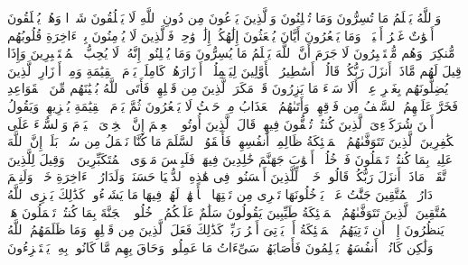 \startbuffer[\q:16:19]
وَٱللَّهُ یَعۡلَمُ مَا تُسِرُّونَ وَمَا تُعۡلِنُونَ%
\stopbuffer%
\startbuffer[\q:16:20]
وَٱلَّذِینَ یَدۡعُونَ مِن دُونِ ٱللَّهِ لَا یَخۡلُقُونَ شَیۡءࣰا وَهُمۡ یُخۡلَقُونَ%
\stopbuffer%
\startbuffer[\q:16:21]
أَمۡوَٰتٌ غَیۡرُ أَحۡیَاۤءࣲۖ وَمَا یَشۡعُرُونَ أَیَّانَ یُبۡعَثُونَ%
\stopbuffer%
\startbuffer[\q:16:22]
إِلَٰهُكُمۡ إِلَٰهࣱ وَٰحِدࣱۚ فَٱلَّذِینَ لَا یُؤۡمِنُونَ بِٱلۡءَاخِرَةِ قُلُوبُهُم مُّنكِرَةࣱ وَهُم مُّسۡتَكۡبِرُونَ%
\stopbuffer%
\startbuffer[\q:16:23]
لَا جَرَمَ أَنَّ ٱللَّهَ یَعۡلَمُ مَا یُسِرُّونَ وَمَا یُعۡلِنُونَۚ إِنَّهُۥ لَا یُحِبُّ ٱلۡمُسۡتَكۡبِرِینَ%
\stopbuffer%
\startbuffer[\q:16:24]
وَإِذَا قِیلَ لَهُم مَّاذَاۤ أَنزَلَ رَبُّكُمۡ قَالُوۤا۟ أَسَٰطِیرُ ٱلۡأَوَّلِینَ%
\stopbuffer%
\startbuffer[\q:16:25]
لِیَحۡمِلُوۤا۟ أَوۡزَارَهُمۡ كَامِلَةࣰ یَوۡمَ ٱلۡقِیَٰمَةِ وَمِنۡ أَوۡزَارِ ٱلَّذِینَ یُضِلُّونَهُم بِغَیۡرِ عِلۡمٍۗ أَلَا سَاۤءَ مَا یَزِرُونَ%
\stopbuffer%
\startbuffer[\q:16:26]
قَدۡ مَكَرَ ٱلَّذِینَ مِن قَبۡلِهِمۡ فَأَتَى ٱللَّهُ بُنۡیَٰنَهُم مِّنَ ٱلۡقَوَاعِدِ فَخَرَّ عَلَیۡهِمُ ٱلسَّقۡفُ مِن فَوۡقِهِمۡ وَأَتَىٰهُمُ ٱلۡعَذَابُ مِنۡ حَیۡثُ لَا یَشۡعُرُونَ%
\stopbuffer%
\startbuffer[\q:16:27]
ثُمَّ یَوۡمَ ٱلۡقِیَٰمَةِ یُخۡزِیهِمۡ وَیَقُولُ أَیۡنَ شُرَكَاۤءِیَ ٱلَّذِینَ كُنتُمۡ تُشَٰۤقُّونَ فِیهِمۡۚ قَالَ ٱلَّذِینَ أُوتُوا۟ ٱلۡعِلۡمَ إِنَّ ٱلۡخِزۡیَ ٱلۡیَوۡمَ وَٱلسُّوۤءَ عَلَى ٱلۡكَٰفِرِینَ%
\stopbuffer%
\startbuffer[\q:16:28]
ٱلَّذِینَ تَتَوَفَّىٰهُمُ ٱلۡمَلَٰۤئِكَةُ ظَالِمِیۤ أَنفُسِهِمۡۖ فَأَلۡقَوُا۟ ٱلسَّلَمَ مَا كُنَّا نَعۡمَلُ مِن سُوۤءِۭۚ بَلَىٰۤۚ إِنَّ ٱللَّهَ عَلِیمُۢ بِمَا كُنتُمۡ تَعۡمَلُونَ%
\stopbuffer%
\startbuffer[\q:16:29]
فَٱدۡخُلُوۤا۟ أَبۡوَٰبَ جَهَنَّمَ خَٰلِدِینَ فِیهَاۖ فَلَبِئۡسَ مَثۡوَى ٱلۡمُتَكَبِّرِینَ%
\stopbuffer%
\startbuffer[\q:16:30]
۞ وَقِیلَ لِلَّذِینَ ٱتَّقَوۡا۟ مَاذَاۤ أَنزَلَ رَبُّكُمۡۚ قَالُوا۟ خَیۡرࣰاۗ لِّلَّذِینَ أَحۡسَنُوا۟ فِی هَٰذِهِ ٱلدُّنۡیَا حَسَنَةࣱۚ وَلَدَارُ ٱلۡءَاخِرَةِ خَیۡرࣱۚ وَلَنِعۡمَ دَارُ ٱلۡمُتَّقِینَ%
\stopbuffer%
\startbuffer[\q:16:31]
جَنَّٰتُ عَدۡنࣲ یَدۡخُلُونَهَا تَجۡرِی مِن تَحۡتِهَا ٱلۡأَنۡهَٰرُۖ لَهُمۡ فِیهَا مَا یَشَاۤءُونَۚ كَذَٰلِكَ یَجۡزِی ٱللَّهُ ٱلۡمُتَّقِینَ%
\stopbuffer%
\startbuffer[\q:16:32]
ٱلَّذِینَ تَتَوَفَّىٰهُمُ ٱلۡمَلَٰۤئِكَةُ طَیِّبِینَ یَقُولُونَ سَلَٰمٌ عَلَیۡكُمُ ٱدۡخُلُوا۟ ٱلۡجَنَّةَ بِمَا كُنتُمۡ تَعۡمَلُونَ%
\stopbuffer%
\startbuffer[\q:16:33]
هَلۡ یَنظُرُونَ إِلَّاۤ أَن تَأۡتِیَهُمُ ٱلۡمَلَٰۤئِكَةُ أَوۡ یَأۡتِیَ أَمۡرُ رَبِّكَۚ كَذَٰلِكَ فَعَلَ ٱلَّذِینَ مِن قَبۡلِهِمۡۚ وَمَا ظَلَمَهُمُ ٱللَّهُ وَلَٰكِن كَانُوۤا۟ أَنفُسَهُمۡ یَظۡلِمُونَ%
\stopbuffer%
\startbuffer[\q:16:34]
فَأَصَابَهُمۡ سَیِّءَاتُ مَا عَمِلُوا۟ وَحَاقَ بِهِم مَّا كَانُوا۟ بِهِۦ یَسۡتَهۡزِءُونَ%
